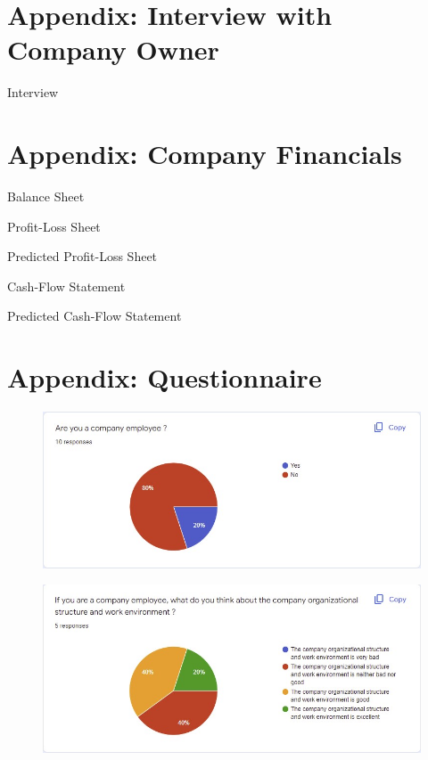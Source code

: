 

\section{Appendix: Interview with Company Owner}

{Interview}

\section{Appendix: Company Financials}
        
{Balance Sheet}
        
{Profit-Loss Sheet}
        
{Predicted Profit-Loss Sheet}
		
{Cash-Flow Statement}		
		
{Predicted Cash-Flow Statement}
        
\section{Appendix: Questionnaire}

	\begin{figure}[H]
    	\centering
    	\includegraphics[width=15cm]{q1.jpg}
    	\label{}
	\end{figure}
	
	\begin{figure}[H]
    	\centering
    	\includegraphics[width=15cm]{q2.jpg}
    	\label{}
	\end{figure}
	
